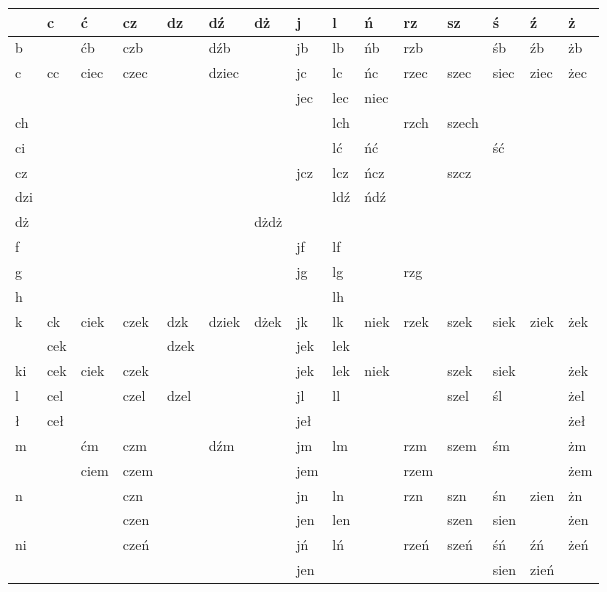 \documentclass{article}
\begin{document}
\begin{longtable}{p{4mm}|p{4mm}p{4mm}p{4mm}p{4mm}p{4mm}p{4mm}p{4mm}p{4mm}p{4mm}p{4mm}p{4mm}p{4mm}p{4mm}p{4mm}}
 & c & ć & cz & dz & dź & dż & j & l & ń & rz & sz & ś & ź & ż\\
\hline
b &  & ćb & czb &  & dźb &  & jb & lb & ńb & rzb &  & śb & źb & żb\\
\hline
c & cc & ciec & czec &  & dziec &  & jc & lc & ńc & rzec & szec & siec & ziec & żec\\
 &  &  &  &  &  &  & jec & lec & niec &  &  &  &  & \\
\hline
ch &  &  &  &  &  &  &  & lch &  & rzch & szech &  &  & \\
\hline
ci &  &  &  &  &  &  &  & lć & ńć &  &  & ść &  & \\
\hline
cz &  &  &  &  &  &  & jcz & lcz & ńcz &  & szcz &  &  & \\
\hline
dzi &  &  &  &  &  &  &  & ldź & ńdź &  &  &  &  & \\
\hline
dż &  &  &  &  &  & dżdż &  &  &  &  &  &  &  & \\
\hline
f &  &  &  &  &  &  & jf & lf &  &  &  &  &  & \\
\hline
g &  &  &  &  &  &  & jg & lg &  & rzg &  &  &  & \\
\hline
h &  &  &  &  &  &  &  & lh &  &  &  &  &  & \\
\hline
k & ck & ciek & czek & dzk & dziek & dżek & jk & lk & niek & rzek & szek & siek & ziek & żek\\
 & cek &  &  & dzek &  &  & jek & lek &  &  &  &  &  & \\
\hline
ki & cek & ciek & czek &  &  &  & jek & lek & niek &  & szek & siek &  & żek\\
\hline
l & cel &  & czel & dzel &  &  & jl & ll &  &  & szel & śl &  & żel\\
\hline
ł & ceł &  &  &  &  &  & jeł &  &  &  &  &  &  & żeł\\
\hline
m &  & ćm & czm &  & dźm &  & jm & lm &  & rzm & szem & śm &  & żm\\
 &  & ciem & czem &  &  &  & jem &  &  & rzem &  &  &  & żem\\
\hline
n &  &  & czn &  &  &  & jn & ln &  & rzn & szn & śn & zien & żn\\
 &  &  & czen &  &  &  & jen & len &  &  & szen & sien &  & żen\\
\hline
ni &  &  & czeń &  &  &  & jń & lń &  & rzeń & szeń & śń & źń & żeń\\
 &  &  &  &  &  &  & jen &  &  &  &  & sien & zień & \\

\end{longtable}
\end{document}
